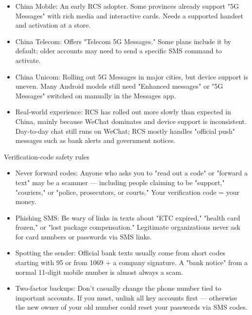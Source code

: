 
\begin{itemize}
  \item China Mobile: An early RCS adopter. Some provinces already support "5G Messages" with rich media and interactive cards. Needs a supported handset and activation at a store.
  \item China Telecom: Offers "Telecom 5G Messages." Some plans include it by default; older accounts may need to send a specific SMS command to activate.
  \item China Unicom: Rolling out 5G Messages in major cities, but device support is uneven. Many Android models still need "Enhanced messages" or "5G Messages" switched on manually in the Messages app.
  \item Real-world experience: RCS has rolled out more slowly than expected in China, mainly because WeChat dominates and device support is inconsistent. Day-to-day chat still runs on WeChat; RCS mostly handles "official push" messages such as bank alerts and government notices.
\end{itemize}

\begin{tcbwarn}{Verification-code safety rules}
\begin{itemize}
  \item Never forward codes: Anyone who asks you to "read out a code" or "forward a text" may be a scammer — including people claiming to be "support," "couriers," or "police, prosecutors, or courts." Your verification code = your money.
  \item Phishing SMS: Be wary of links in texts about "ETC expired," "health card frozen," or "lost package compensation." Legitimate organizations never ask for card numbers or passwords via SMS links.
  \item Spotting the sender: Official bank texts usually come from short codes starting with 95 or from 1069 + a company signature. A "bank notice" from a normal 11-digit mobile number is almost always a scam.
  \item Two-factor backups: Don't casually change the phone number tied to important accounts. If you must, unlink all key accounts first — otherwise the new owner of your old number could reset your passwords via SMS codes.
\end{itemize}

\end{tcbwarn}


